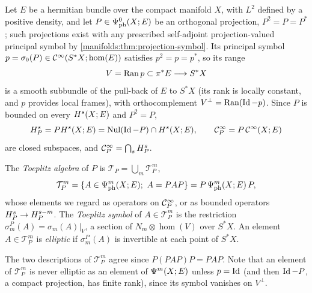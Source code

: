 Let $E$ be a hermitian bundle over the compact manifold $X$, with $L^2$ defined by a
positive density, and let $P\in\Psi^{0}_{\mathrm{ph}}(X;E)$ be an orthogonal projection,
$P^2=P=P^*$; such projections exist with any prescribed self-adjoint projection-valued
principal symbol by \cref{manifolds:thm:projection-symbol}. Its principal symbol
$p=\sigma_0(P)\in\mathcal{C}^\infty(S^*X;\hom(E))$ satisfies $p^2=p=p^*$, so its range
\begin{equation*}
V=\operatorname{Ran} p\subset\pi^*E\longrightarrow S^*X
\end{equation*}
is a smooth subbundle of the pull-back of $E$ to $S^*X$ (its rank is locally constant,
and $p$ provides local frames), with orthocomplement $V^\perp=\operatorname{Ran}(\operatorname{Id}-p)$. Since $P$ is
bounded on every $H^{s}(X;E)$ and $P^2=P$,
\begin{equation*}
H^{s}_P=PH^{s}(X;E)=\operatorname{Nul}(\operatorname{Id}-P)\cap H^{s}(X;E),\qquad \mathcal{C}^\infty_P=P\,\mathcal{C}^\infty(X;E)
\end{equation*}
are closed subspaces, and $\mathcal{C}^\infty_P=\bigcap_sH^{s}_P$.

\begin{definition}\label{manifolds:def:toeplitz}
The \emph{Toeplitz algebra} of $P$ is $\mathcal T_P=\bigcup_m\mathcal T^m_P$,
\begin{equation*}
\mathcal T^m_P=\{A\in\Psi^{m}_{\mathrm{ph}}(X;E);\ A=PAP\}=P\,\Psi^{m}_{\mathrm{ph}}(X;E)\,P,
\end{equation*}
whose elements we regard as operators on $\mathcal{C}^\infty_P$, or as bounded operators
$H^{s}_P\to H^{s-m}_P$. The \emph{Toeplitz symbol} of $A\in\mathcal T^m_P$ is the
restriction $\sigma^P_m(A)=\sigma_m(A)|_V$, a section of $N_m\otimes\hom(V)$ over $S^*X$.
An element $A\in\mathcal T^m_P$ is \emph{elliptic} if $\sigma^P_m(A)$ is invertible at
each point of $S^*X$.
\end{definition}

The two descriptions of $\mathcal T^m_P$ agree since $P(PAP)P=PAP$. Note that an
element of $\mathcal T^m_P$ is never elliptic as an element of $\Psi^{m}(X;E)$ unless $p=\operatorname{Id}$ (and then $\operatorname{Id}-P$,
a compact projection, has finite rank), since its symbol vanishes on $V^\perp$.

